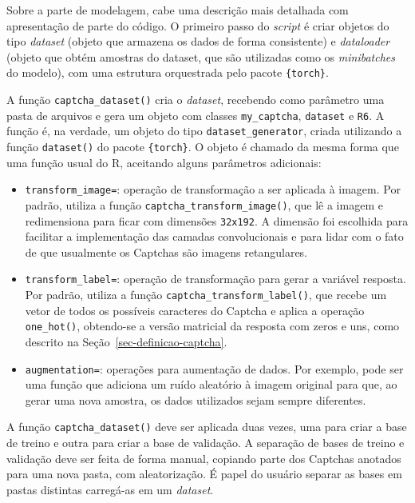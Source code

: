 \documentclass[12pt,twoside,brazilian]{book}
\providecommand{\tightlist}{%
  \setlength{\itemsep}{0pt}\setlength{\parskip}{0pt}}
\begin{document}
Sobre a parte de modelagem, cabe uma descrição mais detalhada com
apresentação de parte do código. O primeiro passo do \emph{script} é
criar objetos do tipo \emph{dataset} (objeto que armazena os dados de
forma consistente) e \emph{dataloader} (objeto que obtém amostras do
dataset, que são utilizadas como os \emph{minibatches} do modelo), com
uma estrutura orquestrada pelo pacote \texttt{\{torch\}}.

A função \texttt{captcha\_dataset()} cria o \emph{dataset}, recebendo
como parâmetro uma pasta de arquivos e gera um objeto com classes
\texttt{my\_captcha}, \texttt{dataset} e \texttt{R6}. A função é, na
verdade, um objeto do tipo \texttt{dataset\_generator}, criada
utilizando a função \texttt{dataset()} do pacote \texttt{\{torch\}}. O
objeto é chamado da mesma forma que uma função usual do R, aceitando
alguns parâmetros adicionais:

\begin{itemize}
\tightlist
\item
  \texttt{transform\_image=}: operação de transformação a ser aplicada à
  imagem. Por padrão, utiliza a função
  \texttt{captcha\_transform\_image()}, que lê a imagem e redimensiona
  para ficar com dimensões \texttt{32x192}. A dimensão foi escolhida
  para facilitar a implementação das camadas convolucionais e para lidar
  com o fato de que usualmente os Captchas são imagens retangulares.
\item
  \texttt{transform\_label=}: operação de transformação para gerar a
  variável resposta. Por padrão, utiliza a função
  \texttt{captcha\_transform\_label()}, que recebe um vetor de todos os
  possíveis caracteres do Captcha e aplica a operação
  \texttt{one\_hot()}, obtendo-se a versão matricial da resposta com
  zeros e uns, como descrito na Seção~\ref{sec-definicao-captcha}.
\item
  \texttt{augmentation=}: operações para aumentação de dados. Por
  exemplo, pode ser uma função que adiciona um ruído aleatório à imagem
  original para que, ao gerar uma nova amostra, os dados utilizados
  sejam sempre diferentes.
\end{itemize}

A função \texttt{captcha\_dataset()} deve ser aplicada duas vezes, uma
para criar a base de treino e outra para criar a base de validação. A
separação de bases de treino e validação deve ser feita de forma manual,
copiando parte dos Captchas anotados para uma nova pasta, com
aleatorização. É papel do usuário separar as bases em pastas distintas
carregá-as em um \emph{dataset}.
\end{document}
